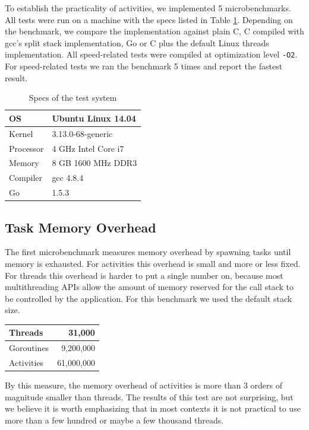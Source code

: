 \documentclass[9pt,preprint]{sigplanconf-2}
\begin{document}
To establish the practicality of activities, we implemented 5 microbenchmarks.
All tests were run on a machine with the specs listed in Table \ref{table:specs}.
Depending on the benchmark, we compare the \charcoal{} implementation against plain C, C compiled with gcc's split stack implementation, Go or C plus the default Linux threads implementation.
All speed-related tests were compiled at optimization level \texttt{-O2}.
For speed-related tests we ran the benchmark 5 times and report the fastest result.

\begin{table}
  \centering
  \begin{tabular}{|l|l|}
    \hline
    OS & Ubuntu Linux 14.04 \\
    \hline
    Kernel & 3.13.0-68-generic \\
    \hline
    Processor & 4 GHz Intel Core i7 \\
    \hline
    Memory & 8 GB 1600 MHz DDR3 \\
    \hline
    Compiler & gcc 4.8.4 \\
    \hline
    Go & 1.5.3 \\
    \hline
  \end{tabular}
  \caption{Specs of the test system}
  \label{table:specs}
\end{table}

\subsection{Task Memory Overhead}

The first microbenchmark measures memory overhead by spawning tasks until memory is exhausted.
For activities this overhead is small and more or less fixed.
For threads this overhead is harder to put a single number on, because most multithreading APIs allow the amount of memory reserved for the call stack to be controlled by the application.
For this benchmark we used the default stack size.

\vspace{1em}
\begin{tabular}{|l|r|}
  \hline
  Threads & 31,000 \\
  \hline
  Goroutines & 9,200,000 \\
  \hline
  Activities & 61,000,000 \\
  \hline
\end{tabular}
\vspace{1em}

By this measure, the memory overhead of activities is more than 3 orders of magnitude smaller than threads.
The results of this test are not surprising, but we believe it is worth emphasizing that in most contexts it is not practical to use more than a few hundred or maybe a few thousand threads.
\end{document}
